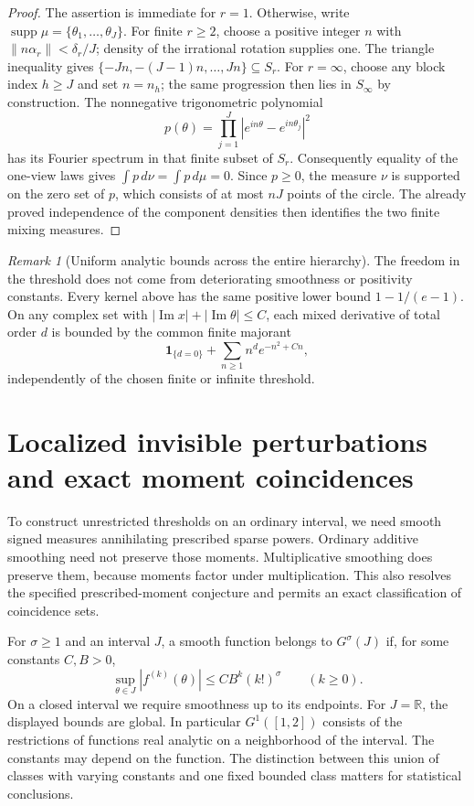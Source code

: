 \documentclass[11pt,letterpaper]{article}
\theoremstyle{definition}
\theoremstyle{remark}
\newtheorem{remark}[theorem]{Remark}
\newcommand{\1}{\mathbf 1}
\begin{document}
\begin{proof}
The assertion is immediate for $r=1$.  Otherwise, write
$\operatorname{supp}\mu=\{\theta_1,\ldots,\theta_J\}$.
For finite $r\ge2$, choose a positive integer $n$ with
$\|n\alpha_r\|<\delta_r/J$; density of the irrational rotation
supplies one.  The triangle inequality gives
$\{-Jn,-(J-1)n,\ldots,Jn\}\subseteq S_r$.
For $r=\infty$, choose any block index $h\ge J$ and set $n=n_h$;
the same progression then lies in $S_\infty$ by construction.
The nonnegative trigonometric polynomial
\[
 p(\theta)=\prod_{j=1}^J
        |e^{in\theta}-e^{in\theta_j}|^2
\]
has its Fourier spectrum in that finite subset of $S_r$.
Consequently equality of the one-view laws gives
$\int p\,d\nu=\int p\,d\mu=0$.
Since $p\ge0$, the measure $\nu$ is supported on the zero set of $p$,
which consists of at most $nJ$ points of the circle.  The already proved
independence of the component densities then identifies the two finite
mixing measures.
\end{proof}

\begin{remark}[Uniform analytic bounds across the entire hierarchy]
The freedom in the threshold does not come from deteriorating smoothness
or positivity constants.  Every kernel above has the same positive
lower bound $1-1/(e-1)$.  On any complex set with
$|\operatorname{Im}x|+|\operatorname{Im}\theta|\le C$, each mixed
derivative of total order $d$ is bounded by the common finite majorant
\[
 \mathbf1_{\{d=0\}}+\sum_{n\ge1} n^d e^{-n^2+Cn},
\]
independently of the chosen finite or infinite threshold.
\end{remark}





\section{Localized invisible perturbations and exact moment coincidences}

To construct unrestricted thresholds on an ordinary interval, we need
smooth signed measures annihilating prescribed sparse powers. Ordinary
additive smoothing need not preserve those moments. Multiplicative
smoothing does preserve them, because moments factor under multiplication.
This also resolves the specified prescribed-moment conjecture and permits
an exact classification of coincidence sets.
\label{p11:sec:smooth-rigidity}

For $\sigma\geq1$ and an interval $J$, a smooth function belongs to
$G^\sigma(J)$ if, for some constants $C,B>0$,
\[
 \sup_{\theta\in J}|f^{(k)}(\theta)|
       \leq C B^k(k!)^\sigma\qquad(k\geq0).
\]
On a closed interval we require smoothness up to its endpoints.
For $J=\mathbb R$, the displayed bounds are global.
In particular $G^1([1,2])$ consists of the restrictions of functions real
analytic on a neighborhood of the interval. The constants may depend on the
function. The distinction between this union of classes with varying
constants and one fixed bounded class matters for statistical conclusions.
\end{document}
